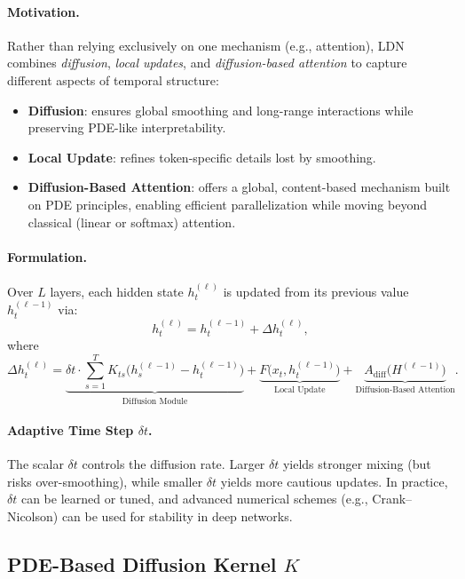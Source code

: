 \paragraph{Motivation.}
Rather than relying exclusively on one mechanism (e.g., attention), LDN combines \textit{diffusion}, \textit{local updates}, and \textit{diffusion-based attention} to capture different aspects of temporal structure:
\begin{itemize}
    \item \textbf{Diffusion}: ensures global smoothing and long-range interactions while preserving PDE-like interpretability.
    \item \textbf{Local Update}: refines token-specific details lost by smoothing.
    \item \textbf{Diffusion-Based Attention}: offers a global, content-based mechanism built on PDE principles, enabling efficient parallelization while moving beyond classical (linear or softmax) attention.
\end{itemize}

\paragraph{Formulation.}
Over \(L\) layers, each hidden state \(h_t^{(\ell)}\) is updated from its previous value \(h_t^{(\ell-1)}\) via:
\[
h_t^{(\ell)} 
= h_t^{(\ell-1)} + \Delta h_t^{(\ell)},
\]
where
\[
\Delta h_t^{(\ell)} 
= \underbrace{\delta t \cdot \sum_{s=1}^{T} K_{ts}\bigl( h_s^{(\ell-1)} - h_t^{(\ell-1)}\bigr)}_{\text{Diffusion Module}} 
+ \underbrace{F\bigl(x_t, h_t^{(\ell-1)}\bigr)}_{\text{Local Update}} 
+ \underbrace{A_{\text{diff}}\bigl(H^{(\ell-1)}\bigr)}_{\text{Diffusion-Based Attention}}.
\]

\paragraph{Adaptive Time Step \(\delta t\).}
The scalar \(\delta t\) controls the diffusion rate. Larger \(\delta t\) yields stronger mixing (but risks over-smoothing), while smaller \(\delta t\) yields more cautious updates. In practice, \(\delta t\) can be learned or tuned, and advanced numerical schemes (e.g., Crank--Nicolson) can be used for stability in deep networks.

\subsection{PDE-Based Diffusion Kernel \texorpdfstring{\(K\)}{}}
